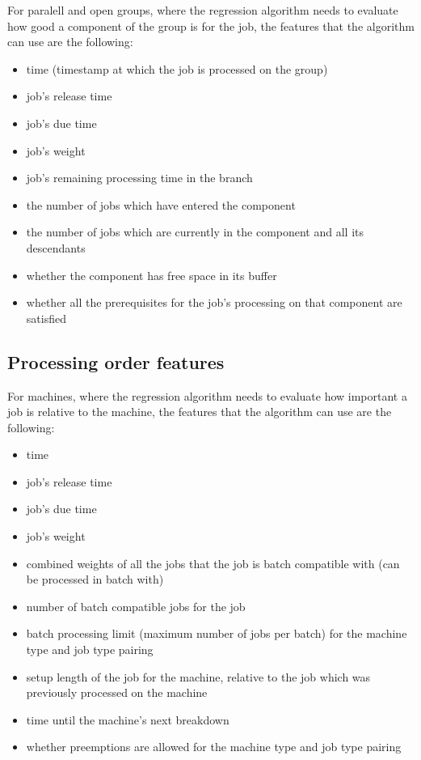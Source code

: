 For paralell and open groups, where the regression algorithm needs to evaluate how good a component of the group is for the job, the features that the algorithm can use are the following:
\begin{itemize}
    \item time (timestamp at which the job is processed on the group)
    \item job's release time
    \item job's due time
    \item job's weight
    \item job's remaining processing time in the branch
    \item the number of jobs which have entered the component
    \item the number of jobs which are currently in the component and all its descendants
    \item whether the component has free space in its buffer
    \item whether all the prerequisites for the job's processing on that component are satisfied
  \end{itemize}

\subsection{Processing order features}

For machines, where the regression algorithm needs to evaluate how important a job is relative to the machine, the features that the algorithm can use are the following:
\begin{itemize}
	\item time
	\item job's release time
	\item job's due time
	\item job's weight
	\item combined weights of all the jobs that the job is batch compatible with (can be processed in batch with)
	\item number of batch compatible jobs for the job
	\item batch processing limit (maximum number of jobs per batch) for the machine type and job type pairing
	\item setup length of the job for the machine, relative to the job which was previously processed on the machine
	\item time until the machine's next breakdown
	\item whether preemptions are allowed for the machine type and job type pairing
\end{itemize}

